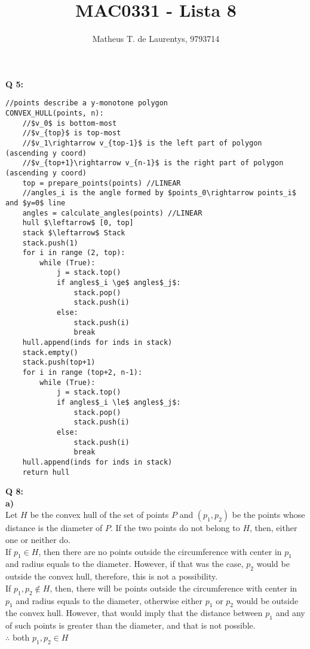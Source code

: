 \documentclass[]{article}
\title{\vspace{-4.0cm}MAC0331 - Lista 8}
\author{Matheus T. de Laurentys, 9793714}
\begin{document}
	\maketitle
	\noindent
	\textbf{Q 5:} \\
	\begin{lstlisting}
//points describe a y-monotone polygon
CONVEX_HULL(points, n):
	//$v_0$ is bottom-most
	//$v_{top}$ is top-most
	//$v_1\rightarrow v_{top-1}$ is the left part of polygon (ascending y coord)
	//$v_{top+1}\rightarrow v_{n-1}$ is the right part of polygon (ascending y coord)
	top = prepare_points(points) //LINEAR
	//angles_i is the angle formed by $points_0\rightarrow points_i$ and $y=0$ line
	angles = calculate_angles(points) //LINEAR
	hull $\leftarrow$ [0, top]
	stack $\leftarrow$ Stack
	stack.push(1)
	for i in range (2, top):
		while (True):
			j = stack.top()
			if angles$_i \ge$ angles$_j$:
				stack.pop()
				stack.push(i)
			else:
				stack.push(i)
				break
	hull.append(inds for inds in stack)
	stack.empty()
	stack.push(top+1)
	for i in range (top+2, n-1):
		while (True):
			j = stack.top()
			if angles$_i \le$ angles$_j$:
				stack.pop()
				stack.push(i)
			else:
				stack.push(i)
				break
	hull.append(inds for inds in stack)
	return hull
	\end{lstlisting}
	\noindent
	\textbf{Q 8:} \\
	\textbf{a)} \\
	Let $H$ be the convex hull of the set of points $P$ and $(p_1, p_2)$ be the points whose distance is the diameter of $P$. If the two points do not belong to $H$, then, either one or neither do.\\
	If $p_1 \in H$, then there are no points outside the circumference with center in $p_1$ and radius equals to the diameter. However, if that was the case, $p_2$ would be outside the convex hull, therefore, this is not a possibility.\\
	If $p_1, p_2 \notin H$, then, there will be points outside the circumference with center in $p_1$ and radius equals to the diameter, otherwise either $p_1$ or $p_2$ would be outside the convex hull. However, that would imply that the distance between $p_1$ and any of such points is greater than the diameter, and that is not possible.\\
	$\therefore$ both $p_1, p_2 \in H$
	
\end{document}
